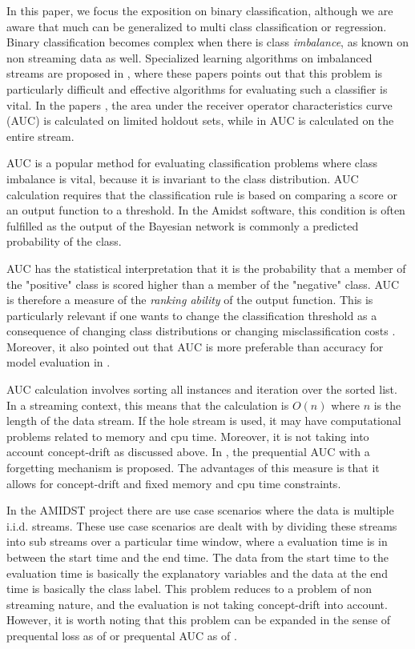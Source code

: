 In this paper, we focus the exposition on binary classification, although we are aware that much can be generalized to multi class classification or regression.  Binary classification becomes complex when there is class \emph{imbalance}, as known  on non streaming data as well.   Specialized learning algorithms on imbalanced streams are proposed in \cite{Dit13, Hoe12, Lic10}, where these papers points out that this problem is particularly difficult and effective algorithms for evaluating such a classifier is vital.  In the papers \cite{Dit13, Lic10}, the area under the receiver operator characteristics curve (AUC) is calculated on limited holdout sets, while in \cite{Hoe12} AUC is calculated on the entire stream.

AUC is a popular method for evaluating classification problems where class imbalance is vital, because it is invariant to the class distribution.  AUC calculation requires that the classification rule is based on comparing a score or an output function to a threshold.  In the Amidst software, this condition is often fulfilled as the output of the Bayesian network is commonly a predicted probability of the class. 

AUC has the statistical interpretation that it is the probability that a member of the "positive" class is scored higher than a member of the "negative" class.  AUC is therefore a measure of the \emph{ranking ability} of the output function.  This is particularly relevant if one wants to change the classification threshold as a consequence of changing class distributions or  changing misclassification costs \cite{Wu07}.  Moreover, it also pointed out that AUC is more preferable than accuracy for model evaluation in \cite{Gam10}.  

AUC calculation involves sorting all instances and iteration over the sorted list.  In a streaming context, this means that the calculation is $O(n)$ where $n$ is the length of the data stream.  If the hole stream is used, it may have computational problems related to memory and cpu time.  Moreover, it is not taking into account concept-drift as discussed above.
In \cite{Brz14}, the prequential AUC with a forgetting mechanism is proposed.  The advantages of this measure is that it allows for concept-drift and fixed memory and cpu time constraints.  

In the AMIDST project there are use case scenarios where the data is multiple i.i.d. streams.  These use case scenarios are dealt with by dividing these streams into sub streams over a particular time window, where a evaluation time is in between the start time and the end time.  The data from the start time to the evaluation time is basically the explanatory variables and the data at the end time is basically the class label.  This problem reduces to a problem of non streaming nature, and the evaluation is not taking concept-drift into account.  However, it is worth noting that this problem can be expanded in the sense of prequental loss as of \cite{Gam13} or prequental AUC as of \cite{Brz14}.  

